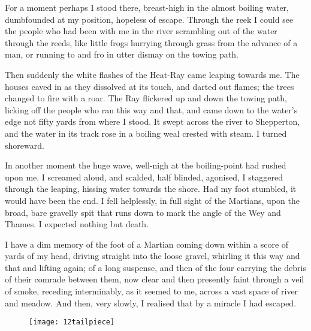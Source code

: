 For a moment perhaps I stood there, breast-high in the almost boiling water, dumbfounded at my position, hopeless of escape. Through the reek I could see the people who had been with me in the river scrambling out of the water through the reeds, like little frogs hurrying through grass from the advance of a man, or running to and fro in utter dismay on the towing path.

Then suddenly the white flashes of the Heat-Ray came leaping towards me. The houses caved in as they dissolved at its touch, and darted out flames; the trees changed to fire with a roar. The Ray flickered up and down the towing path, licking off the people who ran this way and that, and came down to the water's edge not fifty yards from where I stood. It swept across the river to Shepperton, and the water in its track rose in a boiling weal crested with steam. I turned shoreward.

In another moment the huge wave, well-nigh at the boiling-point had rushed upon me. I screamed aloud, and scalded, half blinded, agonised, I staggered through the leaping, hissing water towards the shore. Had my foot stumbled, it would have been the end. I fell helplessly, in full sight of the Martians, upon the broad, bare gravelly spit that runs down to mark the angle of the Wey and Thames. I expected nothing but death.

I have a dim memory of the foot of a Martian coming down within a score of yards of my head, driving straight into the loose gravel, whirling it this way and that and lifting again; of a long suspense, and then of the four carrying the debris of their comrade between them, now clear and then presently faint through a veil of smoke, receding interminably, as it seemed to me, across a vast space of river and meadow. And then, very slowly, I realised that by a miracle I had escaped.

\begin{figure}[b!]
\centering
\texttt{[image: 12tailpiece]}
\end{figure}